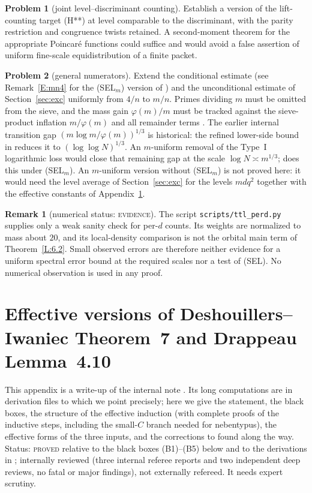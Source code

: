 \documentclass[10pt,reqno]{amsart}
\theoremstyle{definition}
\newtheorem{remark}[theorem]{Remark}
\newtheorem{problem}{Problem}
\numberwithin{equation}{section}
\newcommand{\status}[1]{\textup{\textsc{#1}}}
\begin{document}
\begin{problem}[joint level--discriminant counting]
Establish a version of the lift-counting target (H**) at level
comparable to the discriminant, with the parity restriction and
congruence twists retained.  A second-moment theorem for the
appropriate Poincar\'e functions could suffice and would avoid a
false assertion of uniform fine-scale equidistribution of a finite
packet.
\end{problem}

\begin{problem}[general numerators]
Extend the conditional estimate (see Remark~\ref{E:mn4} for the
(SEL$_m$) version of \cite{MN4}) and the unconditional estimate of
Section~\ref{sec:exc} uniformly from $4/n$ to
$m/n$.  Primes dividing $m$ must be omitted from the sieve, and the
mass gain $\varphi(m)/m$ must be tracked against the sieve-product
inflation $m/\varphi(m)$ and all remainder terms
\cite[remarks after Theorem~3.8]{MN3}.  The earlier internal transition
gap $(m\log m/\varphi(m))^{1/3}$ is historical: the refined lower-side
bound in \cite[\S2, Theorem~L$'$]{MN3} reduces it to
$(\log\log N)^{1/3}$.  An $m$-uniform removal of the Type~I logarithmic
loss would close that remaining gap at the scale
$\log N\asymp m^{1/3}$; \cite{MN4} does this under (SEL$_m$). An
$m$-uniform version without (SEL$_m$) is not proved here: it would need the
level average of Section~\ref{sec:exc} for the levels $mdq^2$ together with
the effective constants of Appendix~\ref{sec:eff}.
\end{problem}

\begin{remark}[numerical status: \status{evidence}]
The script \texttt{scripts/ttl\_perd.py} supplies only a weak sanity
check for per-$d$ counts.  Its weights are normalized to mass about
$20$, and its local-density comparison is not the orbital main term
of Theorem~\ref{L:6.2}.  Small observed errors are therefore neither
evidence for a uniform spectral error bound at the required scales
nor a test of (SEL).  No numerical observation is used in any proof.
\end{remark}
\appendix
\section{Effective versions of Deshouillers--Iwaniec Theorem~7 and Drappeau Lemma~4.10}\label{sec:eff}
This appendix is a write-up of the internal note \cite{TTL3}. Its long
computations are in derivation files to which we point precisely; here we
give the statement, the black boxes, the structure of the effective
induction (with complete proofs of the inductive steps, including the
small-$C$ branch needed for nebentypus), the effective forms of the three
inputs, and the corrections to \cite{DI,Dr} found along the way. Status:
\status{proved} relative to the black boxes (B1)--(B5) below and to the
derivations in \cite{TTL3}; internally reviewed (three internal referee
reports and two independent deep reviews, no fatal or major findings),
not externally refereed. It needs expert scrutiny.
\end{document}
